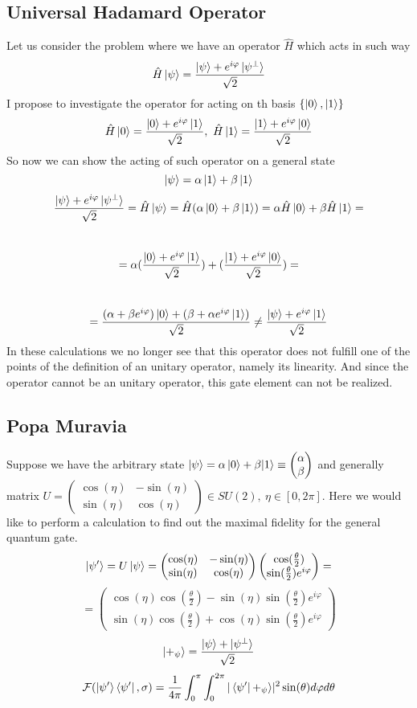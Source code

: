 \documentclass[english,14pt,a4paper]{article}
\begin{document}
	\subsection{Universal Hadamard Operator}
	Let us consider the problem where we have an operator $\hat{H}$ which acts in such way
	\[\hat{H}\ket{\psi}  = \frac{\ket{\psi} + e^{i\varphi}\ket{\psi^{\perp}}}{\sqrt{2}}\]
	I propose to investigate the operator for acting on th basis $\{ \ket{0}, \ket{1}\}$
	\[\hat{H}\ket{0} = \frac{\ket{0} + e^{i\varphi}\ket{1}}{\sqrt{2}}, \ \hat{H}\ket{1} = \frac{\ket{1} + e^{i\varphi}\ket{0}}{\sqrt{2}}\]
	So now we can show the acting of such operator on a general state \[\ket{\psi} = \alpha\ket{1} + \beta\ket{1}\]
		\[ \frac{\ket{\psi} + e^{i\varphi}\ket{\psi^{\perp}}}{\sqrt{2}} = \hat{H}\ket{\psi} = \hat{H}(\alpha \ket{0} + \beta\ket{1}) = \alpha\hat{H}\ket{0}  + \beta\hat{H}\ket{1}=\] \\ \[ = \alpha(\frac{\ket{0} + e^{i\varphi}\ket{1}}{\sqrt{2}}) + (\frac{\ket{1} + e^{i\varphi}\ket{0}}{\sqrt{2}}) =\] \\ \[ = \frac{(\alpha + \beta e^{i\varphi})\ket{0} + (\beta + \alpha e^{i\varphi}\ket{1})}{\sqrt{2}} \neq \frac{\ket{\psi} + e^{i\varphi}\ket{1}}{\sqrt{2}} \]
	In these calculations we no longer see that this operator does not fulfill one of the points of the definition of an unitary operator, namely its linearity. And since the operator cannot be an unitary operator, this gate element can not be realized.

	\subsection{Popa Muravia}	
	Suppose we have the arbitrary state $\ket{\psi} = \alpha\ket{0} + \beta{\ket{1}} \equiv \begin{pmatrix} \alpha \\ \beta \end{pmatrix}$ and generally matrix $U = \begin{pmatrix} \cos(\eta) & -\sin(\eta) \\  \sin(\eta) & \cos(\eta) \end{pmatrix} \in SU(2), \ \eta \in [0, 2\pi]$. Here we would like to perform a calculation to find out the maximal fidelity for the general quantum gate.  
	\[\ket{\psi'} = U\ket{\psi} = \begin{pmatrix} \cos(\eta) & -\sin(\eta) \\  \sin(\eta) & \cos(\eta)\end{pmatrix}\begin{pmatrix} \cos(\frac{\theta}{2}) \\ \sin(\frac{\theta}{2})e^{i\varphi} \end{pmatrix} =\]
	\[= \begin{pmatrix} \cos(\eta)\cos(\frac{\theta}{2}) -\sin(\eta)\sin(\frac{\theta}{2})e^{i\varphi} \\  \sin(\eta)\cos(\frac{\theta}{2}) + \cos(\eta)\sin(\frac{\theta}{2})e^{i\varphi}\end{pmatrix}\]
	\[\ket{+_{\psi}} = \frac{\ket{\psi} + \ket{\psi^{\perp}}}{\sqrt{2}}\]
	\[\mathcal{F}(\ket{\psi'}\bra{\psi'}, \sigma) = \frac{1}{4\pi} \int_0^{\pi} \int_0^{2\pi}|\bra{\psi'}+_{\psi}\rangle|^2\sin(\theta)d\varphi d\theta\]
	
\end{document}
